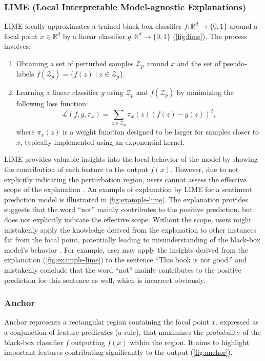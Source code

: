 \documentclass[runningheads]{llncs}
\begin{document}
\subsubsection{%
	LIME (Local Interpretable Model-agnostic Explanations)
	\cite{ribeiro2016why}
}
LIME locally
approximates a trained black-box classifier $f: \mathbb{R}^d \to \{0,1\}$
around a focal point $x \in \mathbb{R}^d$
by a linear classifier $g: \mathbb{R}^d \to \{0,1\}$
(\cref{fig:lime}).
The process involves:
\begin{enumerate}
	\item Obtaining a set of perturbed samples $\mathcal{Z}_p$ around $x$
	      and the set of pseudo-labels $f(\mathcal{Z}_p) = \{f(z) \mid z \in \mathcal{Z}_p\}$.
	\item Learning a linear classifier $g$
	      using $\mathcal{Z}_p$ and $f(\mathcal{Z}_p)$
	      by minimizing the following loss function:
	      \begin{equation}
		      \label{eq:lime_loss}
		      \mathcal{L}(f,g,\pi_x)=\sum_{z\in\mathcal{Z}_p}
		      \pi_x(z){\left(f(z)-g(z)\right)}^2,
	      \end{equation}
	      where $\pi_x(z)$ is a weight function designed to be larger for samples
	      closer to $x$, typically implemented using an exponential kernel.
\end{enumerate}

LIME provides valuable insights into the local behavior of the model
by showing the contribution of each feature to the output $f(x)$.
However, due to not explicitly indicating the perturbation region,
users cannot assess the effective scope of the explanation
\cite{ribeiro2018anchors}.
An example of explanation by LIME for a sentiment prediction model
is illustrated in \cref{fig:example-lime}.
The explanation provides suggests that
the word ``not'' mainly contributes to the positive prediction,
but does not explicitly indicate the effective scope.
Without the scope,
users might mistakenly apply the knowledge derived from the explanation
to other instances far from the focal point,
potentially leading to misunderstanding of the black-box model's behavior
\cite{ribeiro2018anchors}.
For example,
user may apply the insights derived from the explanation
(\cref{fig:example-lime})
to the sentence ``This book is not good.''
and mistakenly conclude that the word ``not''
mainly contributes to the positive prediction for this sentence as well,
which is incorrect obviously.

\subsubsection{Anchor~\cite{ribeiro2018anchors}}\label{sec:anchor}
Anchor represents a rectangular region containing the focal point $x$,
expressed as a conjunction of feature predicates (a rule),
that maximizes the probability of the black-box classifier $f$
outputting $f(x)$ within the region.
It aims to highlight important features
contributing significantly to the output (\cref{fig:anchor}).
\end{document}
